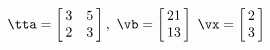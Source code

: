{$\tta = \left[\hskip -3pt \begin{array}{cc} 3&5\\  2&3
\end{array}\hskip -3pt \right],$
 \quad
$\vb = \left[\hskip -3pt \begin{array}{c} 21\\  13\end {array} \hskip -3pt
 \right]$ 
}
{$\vx = \left[\hskip -3pt \begin{array}{c} 2\\  3\end{array}\hskip -3pt \right] $}
 